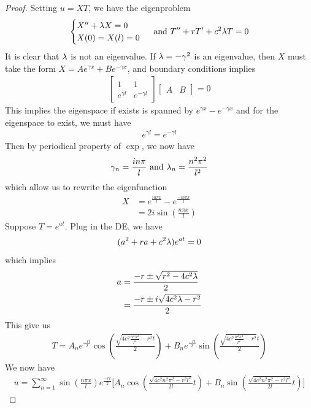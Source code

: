 \documentclass{report}
\begin{document}
\begin{proof}
Setting $u=XT$, we have the eigenproblem 
 \begin{align*}
\begin{cases}
  X''+ \lambda X=0 \\
  X(0)=X(l)=0
\end{cases}\text{ and }T''+rT'+c^2\lambda  T=0
\end{align*}
It is clear that $\lambda $ is not an eigenvalue. If $\lambda = -\gamma ^2$ is an eigenvalue, then $X$ must take the form  $X=Ae^{\gamma x}+Be^{-\gamma x}$, and boundary conditions implies 
\begin{align*}
\begin{bmatrix}
  1 & 1 \\
  e^{\gamma l} & e^{-\gamma l}
\end{bmatrix}\begin{bmatrix}
  A & B
\end{bmatrix}=0
\end{align*}
This implies the eigenspace if exists is spanned by $e^{\gamma x}-e^{-\gamma x}$ and for the eigenspace to exist, we must have 
\begin{align*}
e^{\gamma l}=e^{-\gamma l}
\end{align*}
Then by periodical property of $\exp$, we now have 
\begin{align*}
\gamma_n = \frac{i n \pi  }{l}\text{ and }\lambda _n = \frac{n^2 \pi ^2}{l^2}
\end{align*}
which allow us to rewrite the eigenfunction 
\begin{align*}
X&=e^{\frac{i n\pi x}{l}}- e^{\frac{- i n\pi x}{l}}\\
&= 2i\sin (\frac{n \pi  x}{l})
\end{align*}
Suppose $T=e^{at}$. Plug in the DE, we have
\begin{align*}
  (a^2+ra+c^2\lambda )e^{at}=0
\end{align*}
which implies 
\begin{align*}
a&= \frac{-r \pm \sqrt{r^2 -4c^2\lambda } }{2} \\
&=\frac{-r \pm i \sqrt{4c^2 \lambda -r^2} }{2}
\end{align*}
This give us 
\begin{align*}
T= A_n e^{\frac{-rt}{2}} \cos (\frac{\sqrt{4 c^2 \frac{n^2\pi ^2}{l^2}-r^2} t}{2}) + B_n e^{\frac{-rt}{2}} \sin (\frac{\sqrt{4 c^2 \frac{n^2\pi ^2}{l^2}-r^2}t }{2})
\end{align*}
We now have 
\begin{align*}
u=\sum_{n=1}^{\infty} \sin (\frac{n \pi  x}{l})e^{\frac{-rt}{2}}\Big[ A_n\cos (\frac{\sqrt{4c^2 n^2 \pi ^2-r^2l^2} }{2l}t)+ B_n \sin (\frac{\sqrt{4c^2 n^2 \pi ^2-r^2l^2} }{2l}t)  \Big]
\end{align*}
\end{proof}
\end{document}
